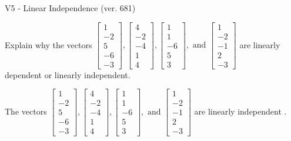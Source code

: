 \begin{exercise}
  \begin{exerciseTitle}V5 - Linear Independence (ver. 681)\end{exerciseTitle}
  \begin{exerciseStatement}
    Explain why the vectors \(\left[\begin{array}{r}
1 \\
-2 \\
5 \\
-6 \\
-3
\end{array}\right] , \left[\begin{array}{r}
4 \\
-2 \\
-4 \\
1 \\
4
\end{array}\right] , \left[\begin{array}{r}
1 \\
1 \\
-6 \\
5 \\
3
\end{array}\right] , \text{ and } \left[\begin{array}{r}
1 \\
-2 \\
-1 \\
2 \\
-3
\end{array}\right]\) are linearly dependent or linearly independent.	


  \end{exerciseStatement}
  \begin{exerciseAnswer}
   The vectors \(\left[\begin{array}{r}
1 \\
-2 \\
5 \\
-6 \\
-3
\end{array}\right] , \left[\begin{array}{r}
4 \\
-2 \\
-4 \\
1 \\
4
\end{array}\right] , \left[\begin{array}{r}
1 \\
1 \\
-6 \\
5 \\
3
\end{array}\right] , \text{ and } \left[\begin{array}{r}
1 \\
-2 \\
-1 \\
2 \\
-3
\end{array}\right]\) are 
  	 linearly independent  .
  


  \end{exerciseAnswer}
\end{exercise}